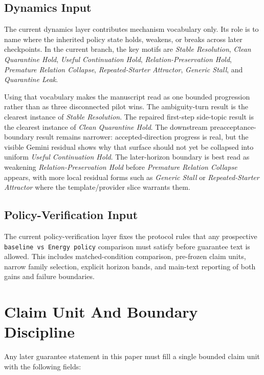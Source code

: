 \documentclass[11pt]{article}
\begin{document}
\subsection{Dynamics Input}

The current dynamics layer contributes mechanism vocabulary only. Its role is to
name where the inherited policy state holds, weakens, or breaks across later
checkpoints. In the current branch, the key motifs are \textit{Stable
Resolution}, \textit{Clean Quarantine Hold}, \textit{Useful Continuation Hold},
\textit{Relation-Preservation Hold}, \textit{Premature Relation Collapse},
\textit{Repeated-Starter Attractor}, \textit{Generic Stall}, and
\textit{Quarantine Leak}.

Using that vocabulary makes the manuscript read as one bounded progression rather
than as three disconnected pilot wins. The ambiguity-turn result is the clearest
instance of \textit{Stable Resolution}. The repaired first-step side-topic result
is the clearest instance of \textit{Clean Quarantine Hold}. The downstream
preacceptance-boundary result remains narrower: accepted-direction progress is
real, but the visible Gemini residual shows why that surface should not yet be
collapsed into uniform \textit{Useful Continuation Hold}. The later-horizon
boundary is best read as weakening \textit{Relation-Preservation Hold} before
\textit{Premature Relation Collapse} appears, with more local residual forms such
as \textit{Generic Stall} or \textit{Repeated-Starter Attractor} where the
template/provider slice warrants them.

\subsection{Policy-Verification Input}

The current policy-verification layer fixes the protocol rules that any prospective
\texttt{baseline vs Energy policy} comparison must satisfy before guarantee text is
allowed. This includes matched-condition comparison, pre-frozen claim units, narrow
family selection, explicit horizon bands, and main-text reporting of both gains and
failure boundaries.

\section{Claim Unit And Boundary Discipline}

Any later guarantee statement in this paper must fill a single bounded claim unit
with the following fields:
\end{document}
